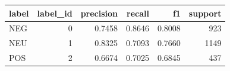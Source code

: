 \begin{tabular}{lrrrrr}
\toprule
label & label_id & precision & recall & f1 & support \\
\midrule
NEG & 0 & 0.7458 & 0.8646 & 0.8008 & 923 \\
NEU & 1 & 0.8325 & 0.7093 & 0.7660 & 1149 \\
POS & 2 & 0.6674 & 0.7025 & 0.6845 & 437 \\
\bottomrule
\end{tabular}
